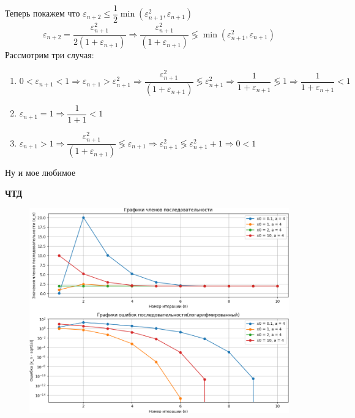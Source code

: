 \documentclass{report}
\begin{document}
\begin{enumerate}
Теперь покажем что $\varepsilon_{n+2}\leq \dfrac{1}{2}\min{(\varepsilon_{n+1}^2,\varepsilon_{n+1})}$
\begin{equation*}
    \varepsilon_{n+2}=\dfrac{\varepsilon_{n+1}^2}{2(1+\varepsilon_{n+1})}\Rightarrow \dfrac{\varepsilon_{n+1}^2}{(1+\varepsilon_{n+1})} \lessgtr \min{(\varepsilon_{n+1}^2,\varepsilon_{n+1})}
\end{equation*}
Рассмотрим три случая:
\begin{enumerate}
	\item $0< \varepsilon_{n+1} <1 \Rightarrow \varepsilon_{n+1}>\varepsilon_{n+1}^2 \Rightarrow \dfrac{\varepsilon_{n+1}^2}{(1+\varepsilon_{n+1})} \lessgtr \varepsilon_{n+1}^2 \Rightarrow \dfrac{1}{1+\varepsilon_{n+1}}\lessgtr1 \Rightarrow \dfrac{1}{1+\varepsilon_{n+1}}<1$
	\item $\varepsilon_{n+1} =1 \Rightarrow \dfrac{1}{1+1}<1$
	\item $\varepsilon_{n+1} >1 \Rightarrow \dfrac{\varepsilon_{n+1}^2}{(1+\varepsilon_{n+1})}\lessgtr \varepsilon_{n+1} \Rightarrow
		\varepsilon_{n+1}^2\lessgtr \varepsilon_{n+1}^2+1 \Rightarrow 0 <1$
\end{enumerate}
Ну и мое любимое
\begin{center}
	\textbf{ЧТД}
\end{center}
\begin{figure}[H]
	\begin{center}
		\includegraphics[scale=0.5]{12.png}
	\end{center}
\end{figure}

\end{enumerate}
\end{document}
